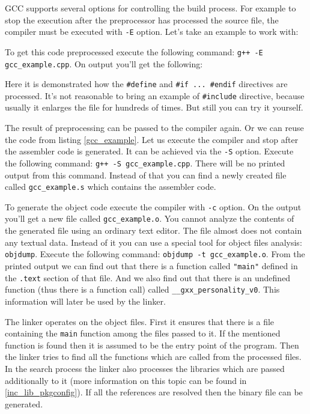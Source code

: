 GCC supports several options for controlling the build process. For example to stop the execution after the preprocessor has processed the source file, the compiler must be executed with {\tt -E} option. Let's take an example to work with: 



To get this code preprocessed execute the following command: {\tt g++ -E gcc\_example.cpp}. On output you'll get the following:



Here it is demonstrated how the {\tt \#define} and {\tt \#if ... \#endif} directives are processed. It's not reasonable to bring an example of {\tt \#include} directive, because usually it enlarges the file for hundreds of times. But still you can try it yourself.

The result of preprocessing can be passed to the compiler again. Or we can reuse the code from listing \ref{gcc_example}. Let us execute the compiler and stop after the assembler code is generated. It can be achieved via the {\tt -S} option. Execute the following command: {\tt g++ -S gcc\_example.cpp}. There will be no printed output from this command. Instead of that you can find a newly created file called {\tt gcc\_example.s} which contains the assembler code.

To generate the object code execute the compiler with {\tt -c} option. On the output you'll get a new file called {\tt gcc\_example.o}. You cannot analyze the contents of the generated file using an ordinary text editor. The file almost does not contain any textual data. Instead of it you can use a special tool for object files analysis: {\tt objdump}. Execute the following command: {\tt objdump -t gcc\_example.o}. From the printed output we can find out that there is a function called {\tt "main"} defined in the {\tt .text} section of that file. And we also find out that there is an undefined function (thus there is a function call) called {\tt \_\_gxx\_personality\_v0}. This information will later be used by the linker.

The linker operates on the object files. First it ensures that there is a file containing the {\tt main} function among the files passed to it. If the mentioned function is found then it is assumed to be the entry point of the program. Then the linker tries to find all the functions which are called from the processed files. In the search process the linker also processes the libraries which are passed additionally to it (more information on this topic can be found in \ref {inc_lib_pkgconfig}). If all the references are resolved then the binary file can be generated.

